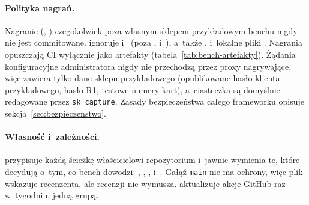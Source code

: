 \paragraph{Polityka nagrań.} Nagranie (, ) czegokolwiek poza
własnym sklepem przykładowym benchu nigdy nie jest commitowane.  ignoruje
 i~ (poza , 
i~), a~także , 
i~lokalne pliki . Nagrania opuszczają CI wyłącznie jako artefakty
(tabela~\ref{tab:bench-artefakty}). Żądania konfiguracyjne administratora nigdy nie
przechodzą przez proxy nagrywające, więc  zawiera tylko dane sklepu
przykładowego (opublikowane hasło klienta przykładowego, hasło R1, testowe numery kart),
a~ciasteczka są domyślnie redagowane przez \texttt{sk capture}. Zasady bezpieczeństwa
całego frameworku opisuje sekcja~\ref{sec:bezpieczenstwo}.

\paragraph{Własność i~zależności.}  przypisuje każdą ścieżkę
właścicielowi repozytorium i~jawnie wymienia te, które decydują o~tym, co bench dowodzi:
, , , 
i~. Gałąź \texttt{main} nie ma ochrony, więc plik wskazuje recenzenta,
ale recenzji nie wymusza.  aktualizuje akcje GitHub raz
w~tygodniu, jedną grupą.

